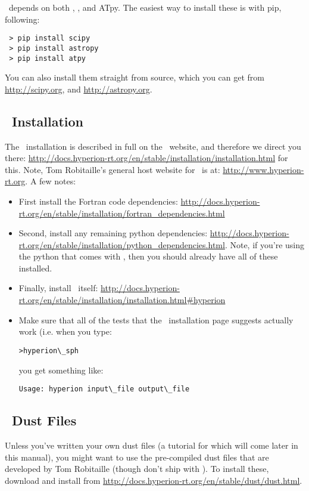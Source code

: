 \pd \ depends on both \scipy, \astropy, and {\sc ATpy}.  The easiest way to
install these is with pip, following:
\begin{verbatim}
 > pip install scipy 
 > pip install astropy
 > pip install atpy
\end{verbatim}
You can also install them straight from source, which you can get from
\url{http://scipy.org}, and \url{http://astropy.org}.

\subsection{\hyperion \ Installation}
The \hyperion \ installation is described in full on the \hyperion
\ website, and therefore we direct you there:
\url{http://docs.hyperion-rt.org/en/stable/installation/installation.html}
for this.  Note, Tom Robitaille's general host website for \hyperion \ is at:
\url{http://www.hyperion-rt.org}. A few notes:
\begin{itemize}
\item First install the Fortran code dependencies: \url{http://docs.hyperion-rt.org/en/stable/installation/fortran_dependencies.html}
\item Second, install any remaining python dependencies:
  \url{http://docs.hyperion-rt.org/en/stable/installation/python_dependencies.html}.
  Note, if you're using the python that comes with \yt, then you
  should already have all of these installed.
\item Finally, install \hyperion \ itself: \url{http://docs.hyperion-rt.org/en/stable/installation/installation.html#hyperion}
\item Make sure that all of the tests that the \hyperion \ installation page suggests actually work (i.e. when you type:
\begin{verbatim}
>hyperion\_sph
\end{verbatim}
you get something like:
\begin{verbatim}
Usage: hyperion input\_file output\_file
\end{verbatim}
\end{itemize}

\subsection{\hyperion \ Dust Files}
Unless you've written your own dust files (a tutorial for which will
come later in this manual), you might want to use the pre-compiled
dust files that are developed by Tom Robitaille (though don't ship
with \hyperion).  To install these, download and install from
\url{http://docs.hyperion-rt.org/en/stable/dust/dust.html}.


